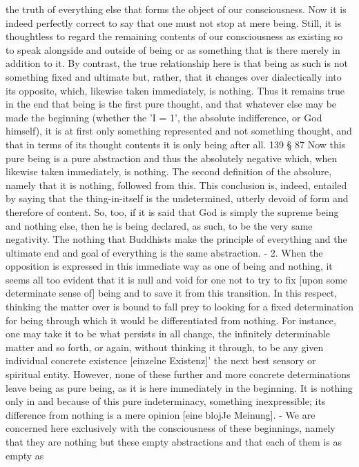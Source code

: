 the truth of everything else that forms the object of our consciousness. Now it
is indeed perfectly correct to say that one must not stop at mere being. Still, it
is thoughtless to regard the remaining contents of our consciousness as existing
so to speak alongside and outside of being or as something that is there merely in
addition to it. By contrast, the true relationship here is that being as such is not
something fixed and ultimate but, rather, that it changes over dialectically into its
opposite, which, likewise taken immediately, is nothing. Thus it remains true in
the end that being is the first pure thought, and that whatever else may be made
the beginning (whether the 'I = 1', the absolute indifference, or God himself), it is at first only something represented and not something thought, and that in
terms of its thought contents it is only being after all.
139
§ 87
Now this pure being is a pure abstraction and thus the absolutely negative
which, when likewise taken immediately, is nothing.
The second definition of the absolure, namely that it is nothing,
followed from this. This conclusion is, indeed, entailed by saying
that the thing-in-itself is the undetermined, utterly devoid of form
and therefore of content. So, too, if it is said that God is simply the
supreme being and nothing else, then he is being declared, as
such, to be the very same negativity. The nothing that Buddhists
make the principle of everything and the ultimate end and goal of
everything is the same abstraction. - 2. When the opposition is
expressed in this immediate way as one of being and nothing, it
seems all too evident that it is null and void for one not to try to fix
[upon some determinate sense of] being and to save it from this
transition. In this respect, thinking the matter over is bound to fall
prey to looking for a fixed determination for being through
which it would be differentiated from nothing. For instance, one
may take it to be what persists in all change, the infinitely
determinable matter and so forth, or again, without thinking it
through, to be any given individual concrete existence [einzelne
Existenz]' the next best sensory or spiritual entity. However, none
of these further and more concrete determinations leave being as
pure being, as it is here immediately in the beginning. It is nothing
only in and because of this pure indeterminacy, something
inexpressible; its difference from nothing is a mere opinion [eine
blojJe Meinung]. - We are concerned here exclusively with the
consciousness of these beginnings, namely that they are nothing
but these empty abstractions and that each of them is as empty as
